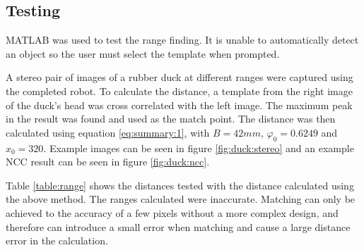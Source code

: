 \subsection{Testing}
MATLAB was used to test the range finding. It is unable to automatically detect an object so the user must select the template when prompted. 

A stereo pair of images of a rubber duck at different ranges were captured using the completed robot. To calculate the distance, a template from the right image of the duck's head was cross correlated with the left image. The maximum peak in the result was found and used as the match point. The distance was then calculated using equation \eqref{eq:summary:1}, with $B=42mm$, $\varphi_0=0.6249$ and $x_0=320$. Example images can be seen in figure \ref{fig:duck:stereo} and an example NCC result can be seen in figure \ref{fig:duck:ncc}. 

Table \ref{table:range} shows the distances tested with the distance calculated using the above method. The ranges calculated were inaccurate. Matching can only be achieved to the accuracy of a few pixels without a more complex design, and therefore can introduce a small error when matching and cause a large distance error in the calculation. 

